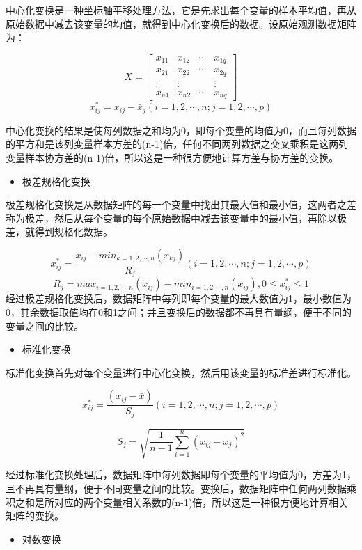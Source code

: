 \documentclass[]{ctexbook}
\providecommand{\tightlist}{%
  \setlength{\itemsep}{0pt}\setlength{\parskip}{0pt}}
\begin{document}
中心化变换是一种坐标轴平移处理方法，它是先求出每个变量的样本平均值，再从原始数据中减去该变量的均值，就得到中心化变换后的数据。设原始观测数据矩阵为：

\[X= \begin{bmatrix} x_{11} & x_{12} & \cdots & x_{1q} \\ x_{21} & x_{22} & \cdots & x_{2q} \\ \vdots & \vdots &  & \vdots \\ x_{n1} & x_{n2} & \cdots & x_{nq} \end{bmatrix} \]
\[ x_{ij}^*=x_{ij}-\bar x_j (i=1,2,\cdots,n;j=1,2,\cdots,p) \]

中心化变换的结果是使每列数据之和均为0，即每个变量的均值为0，而且每列数据的平方和是该列变量样本方差的(n-1)倍，任何不同两列数据之交叉乘积是这两列变量样本协方差的(n-1)倍，所以这是一种很方便地计算方差与协方差的变换。

\begin{itemize}
\tightlist
\item
  极差规格化变换
\end{itemize}

极差规格化变换是从数据矩阵的每一个变量中找出其最大值和最小值，这两者之差称为极差，然后从每个变量的每个原始数据中减去该变量中的最小值，再除以极差，就得到规格化数据。

\[x_{ij}^*=\frac{x_{ij}-min_{k=1,2,\cdots,n} (x_{kj})}{R_j} (i=1,2,\cdots,n;j=1,2,\cdots,p)\]
\[R_j= max_{i=1,2,\cdots,n} (x_{ij})-min_{i=1,2,\cdots,n} (x_{ij}),0\le  x_{ij}^*\le 1\]
经过极差规格化变换后，数据矩阵中每列即每个变量的最大数值为1，最小数值为0，其余数据取值均在0和1之间；并且变换后的数据都不再具有量纲，便于不同的变量之间的比较。

\begin{itemize}
\tightlist
\item
  标准化变换
\end{itemize}

标准化变换首先对每个变量进行中心化变换，然后用该变量的标准差进行标准化。

\[x_{ij}^*=\frac{(x_{ij}-\bar x)}{S_j} (i=1,2,\cdots,n;j=1,2,\cdots,p)\]

\[S_j=\sqrt{\frac{1}{n-1}\sum_{i=1}^n(x_{ij}-\bar x_j)^2}\]

经过标准化变换处理后，数据矩阵中每列数据即每个变量的平均值为0，方差为1，且不再具有量纲，便于不同变量之间的比较。变换后，数据矩阵中任何两列数据乘积之和是所对应的两个变量相关系数的(n-1)倍，所以这是一种很方便地计算相关矩阵的变换。

\begin{itemize}
\tightlist
\item
  对数变换
\end{itemize}
\end{document}
